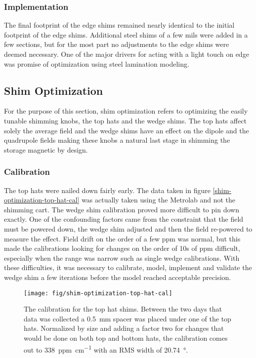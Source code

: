 \subsubsection{Implementation}

The final footprint of the edge shims remained nearly identical to the initial footprint of the edge shims.  Additional steel shims of a few mils were added in a few sections, but for the most part no adjustments to the edge shims were deemed necessary.  One of the major drivers for acting with a light touch on edge was promise of optimization using steel lamination modeling.

\subsection{Shim Optimization}

For the purpose of this section, shim optimization refers to optimizing the easily tunable shimming knobs, the top hats and the wedge shims. The top hats affect solely the average field and the wedge shims have an effect on the dipole and the quadrupole fields making these knobs a natural last stage in shimming the storage magnetic by design.

\subsubsection{Calibration}

The top hats were nailed down fairly early.  The data taken in figure \ref{shim-optimization-top-hat-cal} was actually taken using the Metrolab and not the shimming cart.  The wedge shim calibration proved more difficult to pin down exactly.  One of the confounding factors came from the constraint that the field must be powered down, the wedge shim adjusted and then the field re-powered to measure the effect.  Field drift on the order of a few ppm was normal, but this made the calibrations looking for changes on the order of 10s of ppm difficult, especially when the range was narrow such as single wedge calibrations.  With these difficulties, it was necessary to calibrate, model, implement and validate the wedge shim a few iterations before the model reached acceptable precision.

\begin{figure}
\texttt{[image: fig/shim-optimization-top-hat-cal]}
\caption{The calibration for the top hat shims.  Between the two days that data was collected a \SI{0.5}{\milli\meter} spacer was placed under one of the top hats.  Normalized by size and adding a factor two for changes that would be done on both top and bottom hats, the calibration comes out to \SI{338}{ppm\per\centi\meter} with an RMS width of \SI{20.74}{\degree}.}
\label{fig:shim-optimization-top-hat-cal}
\end{figure}

